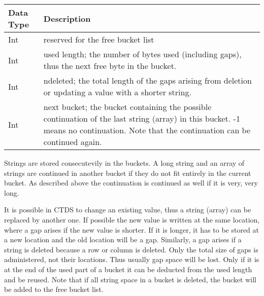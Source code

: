 \vspace{0.15in}
\begin{tabular}{|l|p{13cm}|} \hline
  Data Type & Description \\ \hline\hline
  Int & reserved for the free bucket list \\
  Int & used length; the number of bytes used (including gaps), thus the next free byte in the bucket. \\
  Int & ndeleted; the total length of the
        gaps arising from deletion or updating a value with a shorter string. \\
  Int & next bucket; the bucket containing the possible continuation
        of the last string (array) in this bucket. -1 means no
        continuation. Note that the continuation can be continued again. \\
  \hline
\end{tabular}
\vspace{0.15in}

Strings are stored consecutevily in the buckets. A long string and an
  array of strings are continued in another bucket if they do not fit
  entirely in the current bucket. As described above the continuation is
  continued as well if it is very, very long.

It is possible in CTDS to change an existing value, thus a string
  (array) can
  be replaced by another one. If possible the new value is written at
  the same location, where a gap arises if the new value is
  shorter. If it is longer, it has to be stored at a new location and
  the old location will be a gap. Similarly, a gap arises if a string
  is deleted because a row or column is deleted. Only the total size
  of gaps is administered, not their locations.
  Thus usually gap space will be lost. Only if it is at the end
  of the used part of a bucket it can be deducted from the used length
  and be reused. Note that if all string space in a bucket is deleted,
  the bucket will be added to the free bucket list.


